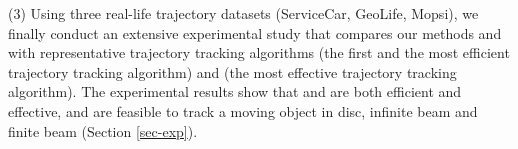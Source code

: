 \ni (3) Using three real-life trajectory datasets (ServiceCar, GeoLife, Mopsi), we finally conduct an extensive experimental study that compares our methods \citt and \bitt with representative trajectory tracking algorithms \ldrh (the first and the most efficient trajectory tracking algorithm) and \grts (the most effective trajectory tracking algorithm). The experimental results show that \citt and \bitt are both efficient and effective, and are feasible to track a moving object in disc, infinite beam and finite beam (Section \ref{sec-exp}).




